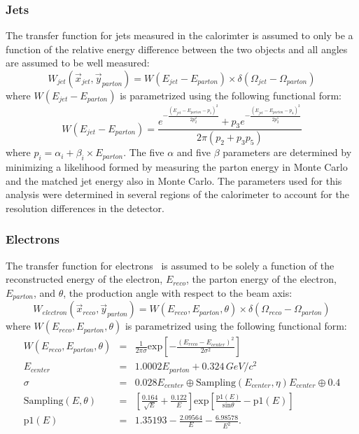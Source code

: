\subsubsection{Jets}

The transfer function for jets measured in the calorimter is assumed
to only be a function of the relative energy difference between the
two objects and all angles are assumed to be well measured:
\begin{equation}
W_{jet}(\vec{x}_{jet}, \vec{y}_{parton}) = W(E_{jet} -
E_{parton}) \times \delta(\Omega_{jet} - \Omega_{parton})
\end{equation}
\noindent where $W(E_{jet} - E_{parton})$ is parametrized using the
following functional form:
\begin{equation}
W(E_{jet} - E_{parton}) = \frac{e^{-\frac{(E_{jet}
- E_{parton} - p_{1})^{2}}{2p^{2}_{2}}} + p_{3}e^{-\frac{(E_{jet}
- E_{parton} - p_{4})^{2}}{2p^{5}_{2}}}}{2\pi(p_{2} + p_{3}p_{5})}
\end{equation}
\noindent where $p_{i} = \alpha_{i} + \beta_{i} \times E_{parton}$.
The five $\alpha$ and five $\beta$ parameters are determined by
minimizing a likelihood formed by measuring the parton energy in Monte
Carlo and the matched jet energy also in Monte Carlo. The parameters
used for this analysis were determined in several regions of the
calorimeter to account for the resolution differences in the detector.


\subsubsection{Electrons}

The transfer function for electrons~\cite{ElectronTF} is assumed to be
solely a function of the reconstructed energy of the electron,
$E_{reco}$, the parton energy of the electron, $E_{parton}$, and
$\theta$, the production angle with respect to the beam axis:
\begin{equation}
W_{electron}(\vec{x}_{reco}, \vec{y}_{parton}) = W(E_{reco},
E_{parton}, \theta) \times \delta(\Omega_{reco} - \Omega_{parton})
\end{equation}
\noindent where $W(E_{reco}, E_{parton}, \theta)$ is parametrized
using the following functional form:
\begin{eqnarray}
W(E_{reco}, E_{parton}, \theta) & = &
\frac{1}{2\pi\sigma}\mathrm{exp}
[-\frac{(E_{reco} - E_{center})^{2}}{2\sigma^{2}}]\\
E_{center} & = &
1.0002 E_{parton} + 0.324\,{GeV}/c^2 \\
\sigma & = &
0.028 E_{center} \oplus \textrm{Sampling}(E_{center},
\eta) E_{center} \oplus 0.4 \\
\textrm{Sampling}(E, \theta) & = &
\left[\frac{0.164}{\sqrt{E}} + \frac{0.122}{E}\right]
\textrm{exp}\left[\frac{\textrm{p1}(E)}
{\textrm{sin}\theta}-\textrm{p1}(E)\right] \\
\textrm{p1}(E)& = & 1.35193 - \frac{2.09564}{E} - \frac{6.98578}{E^2}.
\end{eqnarray}


